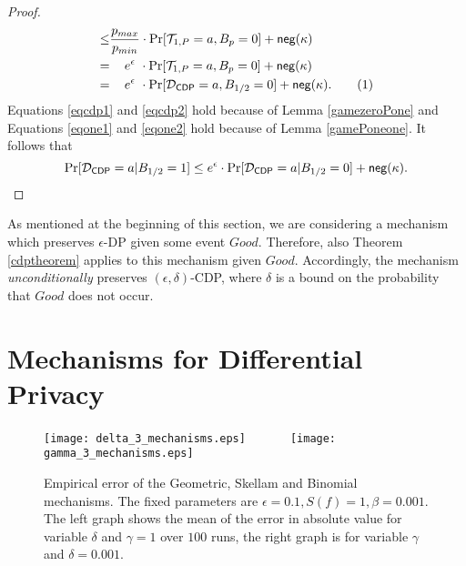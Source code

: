 \documentclass[10pt]{extarticle}
\newcommand\numberthis{\addtocounter{equation}{1}\tag{\theequation}}
\begin{document}
\begin{proof}
\begin{align*}
 \leq & \frac{p_{max}}{p_{min}}\cdot\Pr[\mathcal{T}_{1,P}=a, B_p=0]+\mbox{\upshape\sffamily neg}(\kappa)\\
 = & \,\,\,\,\,\,\,e^\epsilon\,\,\cdot\Pr[\mathcal{T}_{1,P}=a, B_p=0]+\mbox{\upshape\sffamily neg}(\kappa)\\
 = & \,\,\,\,\,\,\,e^\epsilon\,\,\cdot\Pr[\mathcal{D}_{\mbox{\scriptsize\upshape\sffamily CDP}}=a, B_{1/2}=0]+\mbox{\upshape\sffamily neg}(\kappa).\numberthis\label{eqcdp2}
\end{align*}
Equations \eqref{eqcdp1} and \eqref{eqcdp2} hold because of Lemma \ref{gamezeroPone} and Equations \eqref{eqone1} and \eqref{eqone2} hold because of Lemma \ref{gamePoneone}. 
It follows that
\[\Pr[\mathcal{D}_{\mbox{\scriptsize\upshape\sffamily CDP}}=a| B_{1/2}=1]\leq e^\epsilon\cdot \Pr[\mathcal{D}_{\mbox{\scriptsize\upshape\sffamily CDP}}=a| B_{1/2}=0]+\mbox{\upshape\sffamily neg}(\kappa).\]
\end{proof}

As mentioned at the beginning of this section, we are considering a mechanism which preserves $\epsilon$-\mbox{\upshape\sffamily DP} given some event $Good$. Therefore, also Theorem \ref{cdptheorem} applies to this mechanism given $Good$. Accordingly, the mechanism \textit{unconditionally} preserves $(\epsilon,\delta)$-\mbox{\upshape\sffamily CDP}, where $\delta$ is a bound on the probability that $Good$ does not occur.




























\section{Mechanisms for Differential Privacy}\label{dpmech}

\begin{figure*}\centering
\texttt{[image: delta\_3\_mechanisms.eps]}\,\,\,\,\,\,\,\,\,\,\,\,\,\,\,\,\,\,\,\,\,\texttt{[image: gamma\_3\_mechanisms.eps]}
\caption{Empirical error of the Geometric, Skellam and Binomial mechanisms. The fixed parameters are $\epsilon=0.1, S(f)=1, \beta=0.001$. The left graph shows the mean of the error in absolute value for variable $\delta$ and $\gamma=1$ over $100$ runs, the right graph is for variable $\gamma$ and $\delta=0.001$.}\label{accuracycomp}
\end{figure*}
\end{document}

